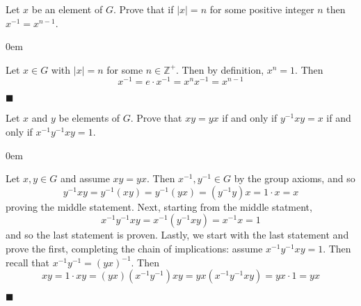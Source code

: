 \documentclass[12pt]{article}
\renewcommand{\qed}{\hfill$\blacksquare$}
\renewenvironment{proof}{\begin{addmargin}[1em]{0em}\begin{newproof}}{\end{newproof}\end{addmargin}\qed}
\newenvironment{problem}[2][Exercise]{\begin{trivlist}
\item[\hskip \labelsep {\bfseries #1}\hskip \labelsep {\bfseries #2.}]}{\end{trivlist}}
\begin{document}
\begin{problem}{1.1.17}
Let $x$ be an element of $G$. Prove that if $\left|x\right|=n$ for some positive integer $n$ then $x^{-1}=x^{n-1}$.
\end{problem}
\begin{proof}
Let $x\in G$ with $\left|x\right|=n$ for some $n\in \mathbb{Z}^+$. Then by definition, $x^n=1$. Then
$$ x^{-1} = e\cdot x^{-1} = x^n x^{-1} = x^{n-1} $$
\end{proof}





\begin{problem}{1.1.18}
Let $x$ and $y$ be elements of $G$. Prove that $xy=yx$ if and only if $y^{-1}xy = x $ if and only if $x^{-1}y^{-1}xy=1$.
\end{problem}
\begin{proof}
Let $x,y\in G$ and assume $xy=yx$. Then $x^{-1},y^{-1}\in G$ by the group axioms, and so
$$ y^{-1} x y = y^{-1}\left(xy\right) = y^{-1} \left(y x\right) = \left(y^{-1}y\right)x = 1\cdot x = x $$
proving the middle statement. Next, starting from the middle statment,
$$ x^{-1}y^{-1}xy = x^{-1}\left(y^{-1}xy\right) = x^{-1}x = 1 $$ and so the last statement is proven. Lastly, we start with the last statement and prove the first, completing the chain of implications:
assume $x^{-1}y^{-1}xy =1$. Then recall that $x^{-1}y^{-1}=\left(yx\right)^{-1}$. Then
$$ xy = 1\cdot xy = \left(yx\right)\left(x^{-1}y^{-1}\right)xy = yx \left(x^{-1}y^{-1}xy\right) = yx\cdot 1 = yx $$
\end{proof}
\end{document}
